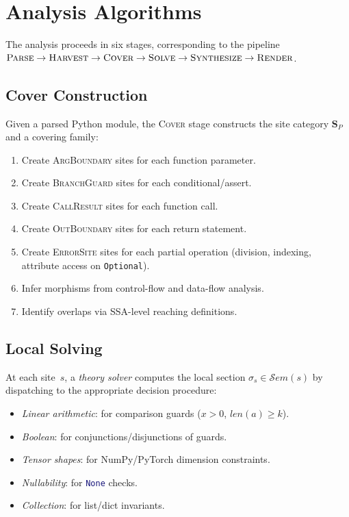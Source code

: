 \documentclass[acmsmall,screen,review,anonymous]{acmart}
\theoremstyle{remark}
\newcommand{\Sem}{\mathcal{S}\mathit{em}}
\newcommand{\py}[1]{\lstinline[language=Python]{#1}}
\begin{document}
\section{Analysis Algorithms}\label{sec:algorithms}

The analysis proceeds in six stages, corresponding to the pipeline
$\textsc{Parse} \to \textsc{Harvest} \to \textsc{Cover} \to
\textsc{Solve} \to \textsc{Synthesize} \to \textsc{Render}$.

\subsection{Cover Construction}\label{sec:cover-construction}

Given a parsed Python module, the \textsc{Cover} stage constructs the
site category $\mathbf{S}_P$ and a covering family:

\begin{enumerate}[nosep]
  \item Create \textsc{ArgBoundary} sites for each function parameter.
  \item Create \textsc{BranchGuard} sites for each conditional/assert.
  \item Create \textsc{CallResult} sites for each function call.
  \item Create \textsc{OutBoundary} sites for each return statement.
  \item Create \textsc{ErrorSite} sites for each partial operation
    (division, indexing, attribute access on \py{Optional}).
  \item Infer morphisms from control-flow and data-flow analysis.
  \item Identify overlaps via SSA-level reaching definitions.
\end{enumerate}

\subsection{Local Solving}\label{sec:local-solving}

At each site~$s$, a \emph{theory solver} computes the local section
$\sigma_s \in \Sem(s)$ by dispatching to the appropriate decision
procedure:

\begin{itemize}[nosep]
  \item \emph{Linear arithmetic}: for comparison guards
    ($x > 0$, $\mathit{len}(a) \geq k$).
  \item \emph{Boolean}: for conjunctions/disjunctions of guards.
  \item \emph{Tensor shapes}: for NumPy/PyTorch dimension constraints.
  \item \emph{Nullability}: for \py{None} checks.
  \item \emph{Collection}: for list/dict invariants.
\end{itemize}
\end{document}
